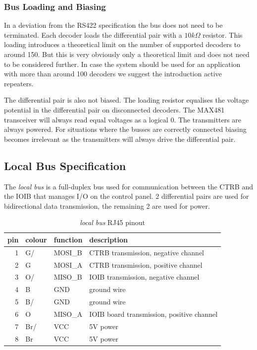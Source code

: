 \documentclass{scrreprt}
\begin{document}
\subsubsection {Bus Loading and Biasing}
In a deviation from the RS422 specification the bus does not need to be terminated. Each decoder loads the differential pair with a $10k\Omega$ resistor. This loading introduces a theoretical limit on the number of supported decoders to around 150. But this is very obviously only a theoretical limit and does not need to be considered further. In case the system should be used for an application with more than around 100 decoders we suggest the introduction active repeaters.

The differential pair is also not biased. The loading resistor equalises the voltage potential in the differential pair on disconnected decoders. The MAX481 transceiver will always read equal voltages as a logical $0$. The transmitters are always powered. For situations where the busses are correctly connected biasing becomes irrelevant as the transmitters will always drive the differential pair.

\subsection{Local Bus Specification}
The \emph{local bus} is a full-duplex bus used for communication between the CTRB and the IOIB that manages I/O on the control panel. 2 differential pairs are used for bidirectional data transmission, the remaining 2 are used for power.

\begin{table}[ht!]
\centering
\begin{tabular}{ |r|l|l|l| }
\hline
pin & colour & function & description \\\hline\hline
  1 & G/     & MOSI\_B  & CTRB transmission, negative channel \\\hline
  2 & G      & MOSI\_A  & CTRB transmission, positive channel \\\hline
  3 & O/     & MISO\_B  & IOIB transmission, negative channel \\\hline
  4 & B      & GND      & ground wire \\\hline
  5 & B/     & GND      & ground wire \\\hline
  6 & O      & MISO\_A  & IOIB board transmission, positive channel \\\hline
  7 & Br/    & VCC      & 5V power \\\hline
  8 & Br     & VCC      & 5V power \\\hline
\end{tabular}
\caption{\emph{local bus} RJ45 pinout}
\end{table}
\end{document}
